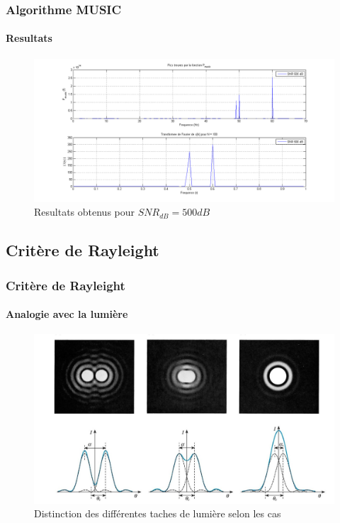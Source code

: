 \documentclass[10pt]{beamer}
\begin{document}
    
    \begin{frame}
        \frametitle{Algorithme MUSIC}
        \framesubtitle{Resultats}
        
        \begin{figure}[h]
            \centering
            \includegraphics[scale= 0.28]{images/snr500}
            \caption{Resultats obtenus pour \(SNR_{dB} = 500 dB\)}
            \label{fig:wave500}
        \end{figure}
        
    \end{frame}
    

    \subsection{Critère de Rayleight}    
    \begin{frame}
        \frametitle{Critère de Rayleight}
        \framesubtitle{Analogie avec la lumière}
        
        \begin{figure}[h]
            \centering
            \includegraphics[scale= 0.22]{images/Critere_Rayleight2}
            \caption{Distinction des différentes taches de lumière selon les cas}
        \end{figure}

    \end{frame}
    
\end{document}
